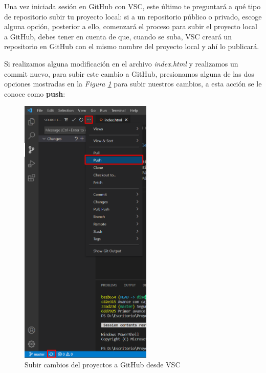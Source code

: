 Una vez iniciada sesión en GitHub con VSC, este último te preguntará a qué tipo de repositorio subir tu proyecto local: si a un repositorio público o privado, escoge alguna opción, posterior a ello, comenzará el proceso para subir el proyecto local a GitHub, debes tener en cuenta de que, cuando se suba, VSC creará un repositorio en GitHub con el mismo nombre del proyecto local y ahí lo publicará.

Si realizamos alguna modificación en el archivo \textit{index.html} y realizamos un commit nuevo, para subir este cambio a GitHub, presionamos alguna de las dos opciones mostradas en la \textit{Figura \ref{fig: 28}} para subir nuestros cambios, a esta acción se le conoce como \textbf{push}:
\begin{figure}[H]
    \centering
    \caption{Subir cambios del proyectos a GitHub desde VSC}
    \label{fig: 28}
    \includegraphics[height=13cm]{capturas/subir_proyecto2.png}
\end{figure}

